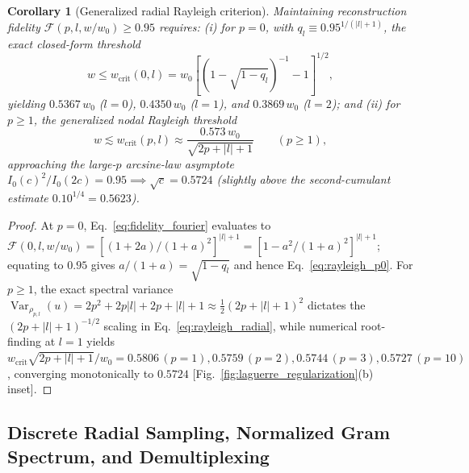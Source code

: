 \documentclass[aps,pra,reprint,amsmath,amssymb,floatfix,longbibliography]{revtex4-2}
\providecommand{\abs}[1]{\lvert#1\rvert}
\newtheorem{corollary}{Corollary}
\begin{document}
\begin{corollary}[Generalized radial Rayleigh criterion]
\label{cor:rayleigh_radial}
Maintaining reconstruction fidelity $\mathcal{F}(p,l,w/w_0) \ge 0.95$ requires: (i) for $p = 0$, with $q_l \equiv 0.95^{1/(\abs{l}+1)}$, the exact closed-form threshold
\begin{equation}
w \le w_{\mathrm{crit}}(0,l) = w_0 \left[\left(1 - \sqrt{1 - q_l}\right)^{-1} - 1\right]^{1/2},
\label{eq:rayleigh_p0}
\end{equation}
yielding $0.5367\,w_0$ ($l = 0$), $0.4350\,w_0$ ($l = 1$), and $0.3869\,w_0$ ($l = 2$); and (ii) for $p \ge 1$, the generalized nodal Rayleigh threshold
\begin{equation}
w \lesssim w_{\mathrm{crit}}(p,l) \approx \frac{0.573\,w_0}{\sqrt{2p + \abs{l} + 1}} \qquad (p \ge 1),
\label{eq:rayleigh_radial}
\end{equation}
approaching the large-$p$ arcsine-law asymptote $I_0(c)^2/I_0(2c) = 0.95 \implies \sqrt{c} = 0.5724$ (slightly above the second-cumulant estimate $0.10^{1/4} = 0.5623$).
\end{corollary}
\begin{proof}
At $p = 0$, Eq.~\eqref{eq:fidelity_fourier} evaluates to $\mathcal{F}(0,l,w/w_0) = [(1+2a)/(1+a)^2]^{\abs{l}+1} = [1 - a^2/(1+a)^2]^{\abs{l}+1}$; equating to $0.95$ gives $a/(1+a) = \sqrt{1 - q_l}$ and hence Eq.~\eqref{eq:rayleigh_p0}. For $p \ge 1$, the exact spectral variance $\operatorname{Var}_{\rho_{p,l}}(u) = 2p^2 + 2p\abs{l} + 2p + \abs{l} + 1 \approx \frac{1}{2}(2p+\abs{l}+1)^2$ dictates the $(2p+\abs{l}+1)^{-1/2}$ scaling in Eq.~\eqref{eq:rayleigh_radial}, while numerical root-finding at $l = 1$ yields $w_{\mathrm{crit}}\sqrt{2p+\abs{l}+1}/w_0 = 0.5806\,(p=1), 0.5759\,(p=2), 0.5744\,(p=3), 0.5727\,(p=10)$, converging monotonically to $0.5724$ [Fig.~\ref{fig:laguerre_regularization}(b) inset].
\end{proof}

\subsection{Discrete Radial Sampling, Normalized Gram Spectrum, and Demultiplexing}
\label{subsec:gram_sampling}
\end{document}
